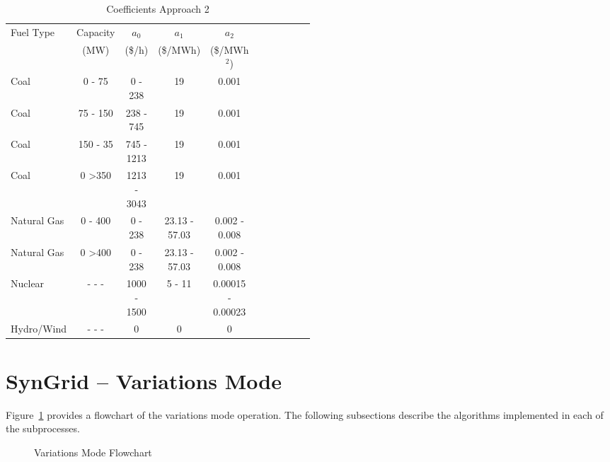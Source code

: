 \documentclass[12pt]{article}
\newcommand{\syngrid}[0]{{SynGrid}}
\numberwithin{equation}{section}
\numberwithin{table}{section}
\numberwithin{figure}{section}
\begin{document}
\begin{table}
\centering
\begin{threeparttable}
\caption{Coefficients Approach 2}
\label{tab_cob}
\footnotesize
\begin{tabular}{l c c c c p{0.50\linewidth}}
\toprule
Fuel Type & Capacity & $a_0$  & $a_1$    & $a_2$ \\
          & (MW)     & (\$/h) & (\$/MWh) & (\$/MWh$^2$) \\
\midrule
Coal      & 0 - 75     & 0 - 238       & 19   & 0.001   \\
Coal      & 75 - 150   & 238 - 745     & 19   & 0.001  \\
Coal      & 150 - 35   & 745 - 1213    & 19   & 0.001   \\
Coal      & 0 \textgreater 350      & 1213 - 3043   & 19   & 0.001  \\
Natural Gas       & 0 - 400   & 0 - 238      & 23.13 - 57.03   & 0.002 - 0.008  \\
Natural Gas       & 0 \textgreater 400     & 0 - 238      & 23.13 - 57.03   & 0.002 - 0.008   \\
Nuclear               & - - -     & 1000 - 1500  & 5 - 11          & 0.00015 - 0.00023        \\
Hydro/Wind              & - - -     & 0            & 0               & 0      \\
\bottomrule
\end{tabular}
\end{threeparttable}
\end{table}



\clearpage
\section{\syngrid{} -- Variations Mode}
\label{sec:syngrid_vm}
Figure~\ref{fig:syngrid_flowchart} provides a flowchart of the variations mode operation.
The following subsections describe the algorithms implemented in each of the subprocesses.
	
\begin{figure}
\centering
\resizebox{0.9\textwidth}{!}{}
\caption{Variations Mode Flowchart}
\label{fig:syngrid_flowchart}
\end{figure}

\end{document}
